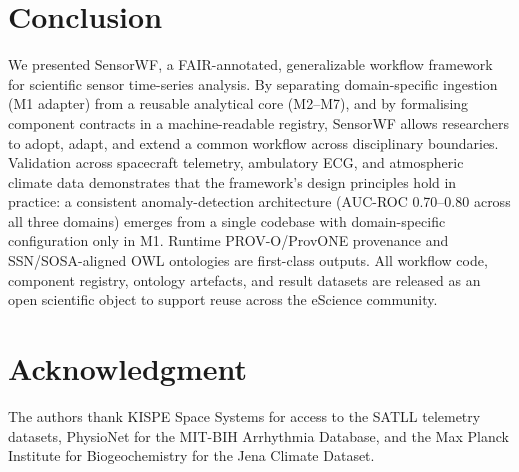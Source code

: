 \documentclass[conference]{IEEEtran}
\begin{document}
\section{Conclusion}
\label{sec:conclusion}

We presented SensorWF, a FAIR-annotated, generalizable workflow framework for
scientific sensor time-series analysis. By separating domain-specific ingestion
(M1 adapter) from a reusable analytical core (M2--M7), and by formalising
component contracts in a machine-readable registry, SensorWF allows researchers
to adopt, adapt, and extend a common workflow across disciplinary boundaries.
Validation across spacecraft telemetry, ambulatory ECG, and atmospheric climate
data demonstrates that the framework's design principles hold in practice: a
consistent anomaly-detection architecture (AUC-ROC 0.70--0.80 across all three
domains) emerges from a single codebase with domain-specific configuration only
in M1. Runtime PROV-O/ProvONE provenance and SSN/SOSA-aligned OWL ontologies
are first-class outputs. All workflow code, component registry, ontology
artefacts, and result datasets are released as an open scientific object to
support reuse across the eScience community.

\section*{Acknowledgment}

The authors thank KISPE Space Systems for access to the SATLL telemetry datasets,
PhysioNet for the MIT-BIH Arrhythmia Database, and the Max Planck Institute for
Biogeochemistry for the Jena Climate Dataset.





\end{document}
